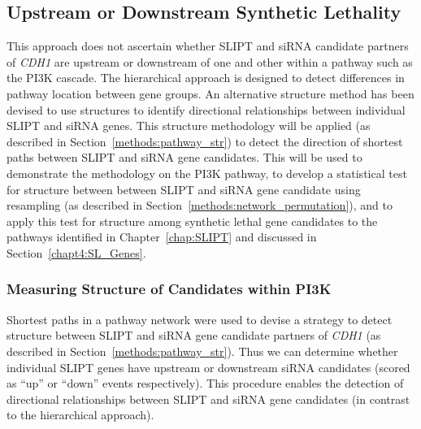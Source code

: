 \subsection{Upstream or Downstream Synthetic Lethality}

This approach does not ascertain whether \gls{SLIPT} and \gls{siRNA} candidate partners of \textit{CDH1} are upstream or downstream of one and other within a pathway such as the \gls{PI3K} cascade. The hierarchical approach is designed to detect differences in pathway location between gene groups. An alternative  structure method has been devised to use  structures to identify directional relationships between individual \gls{SLIPT} and \gls{siRNA} genes. This  structure methodology will be applied (as described in Section~\ref{methods:pathway_str}) to detect the direction of \glspl{shortest path} between \gls{SLIPT} and \gls{siRNA} gene candidates. This will be used to demonstrate the methodology on the \gls{PI3K} pathway, to develop a statistical test for  structure between between \gls{SLIPT} and \gls{siRNA} gene candidate using resampling  (as described in Section~\ref{methods:network_permutation}), and to apply this test for  structure among \gls{synthetic lethal} gene candidates to the pathways identified in Chapter~\ref{chap:SLIPT} and discussed in Section~\ref{chapt4:SL_Genes}.

\FloatBarrier

\subsubsection{Measuring Structure of Candidates within PI3K}  \label{chapt4:Structure_PI3K}

Shortest paths in a pathway network were used to devise a strategy to detect  structure between \gls{SLIPT} and \gls{siRNA} gene candidate partners of \textit{CDH1} (as described in Section~\ref{methods:pathway_str}). Thus we can determine whether individual \gls{SLIPT} genes have upstream or downstream \gls{siRNA} candidates (scored as ``up'' or ``down'' events respectively). This procedure enables the detection of directional relationships between \gls{SLIPT} and \gls{siRNA} gene candidates (in contrast to the hierarchical approach).



